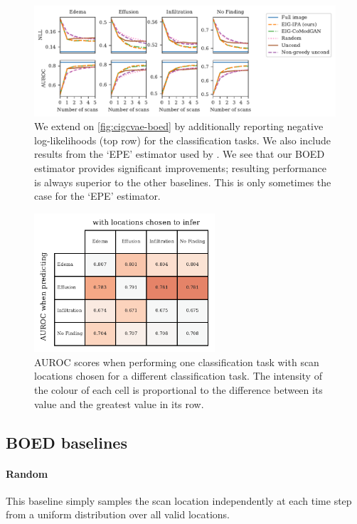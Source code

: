 \begin{figure}[t]
  \centering
  \includegraphics[width=\textwidth]{figs/cigcvae/boed-auroc-curve-supp}
  \caption{We extend on \cref{fig:cigcvae-boed} by additionally reporting negative
    log-likelihoods (top row) for the classification tasks. We also include
    results from the `EPE' estimator used by \citet{harvey2019near}. We see that
    our BOED estimator provides significant improvements; resulting performance
    is always superior to the other baselines. This is only sometimes the case
    for the `EPE' estimator. }
  \label{fig:cigcvae-boed-auroc-supp}
\end{figure}

\begin{figure}[t]
  \centering
  \includegraphics[width=0.6\textwidth]{figs/cigcvae/table-AUROC-boed}
  \caption{AUROC scores when performing one classification task with scan
    locations chosen for a different classification task. The intensity of the
    colour of each cell is proportional to the difference between its value and
    the greatest value in its row.}
  \label{fig:cigcvae-boed-correlations}
\end{figure}

\subsection{BOED baselines}
\paragraph{Random}
This baseline simply samples the scan location independently at each time step
from a uniform distribution over all valid locations.


